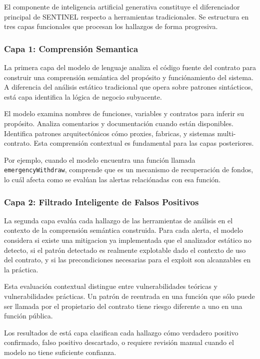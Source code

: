 \documentclass[12pt,a4paper,twoside]{book}
\begin{document}
El componente de inteligencia artificial generativa constituye el diferenciador principal de SENTINEL respecto a herramientas tradicionales. Se estructura en tres capas funcionales que procesan los hallazgos de forma progresiva.

\subsubsection{Capa 1: Comprensión Semantica}

La primera capa del modelo de lenguaje analiza el código fuente del contrato para construir una comprensión semántica del propósito y funciónamiento del sistema. A diferencia del análisis estático tradicional que opera sobre patrones sintácticos, está capa identifica la lógica de negocio subyacente.

El modelo examina nombres de funciones, variables y contratos para inferir su propósito. Analiza comentarios y documentación cuando están disponibles. Identifica patrones arquitectónicos cómo proxies, fabricas, y sistemas multi-contrato. Esta comprensión contextual es fundamental para las capas posteriores.

Por ejemplo, cuando el modelo encuentra una función llamada \texttt{emergencyWithdraw}, comprende que es un mecanismo de recuperación de fondos, lo cuál afecta como se evalúan las alertas relaciónadas con esa función.

\subsubsection{Capa 2: Filtrado Inteligente de Falsos Positivos}

La segunda capa evalúa cada hallazgo de las herramientas de análisis en el contexto de la comprensión semántica construida. Para cada alerta, el modelo considera si existe una mitigacion ya implementada que el analizador estático no detecto, si el patrón detectado es realmente explotable dado el contexto de uso del contrato, y si las precondiciones necesarias para el exploit son alcanzables en la práctica.

Esta evaluación contextual distingue entre vulnerabilidades teóricas y vulnerabilidades prácticas. Un patrón de reentrada en una función que sólo puede ser llamada por el propietario del contrato tiene riesgo diferente a uno en una función pública.

Los resultados de está capa clasifican cada hallazgo cómo verdadero positivo confirmado, falso positivo descartado, o requiere revisión manual cuando el modelo no tiene suficiente confianza.
\end{document}
